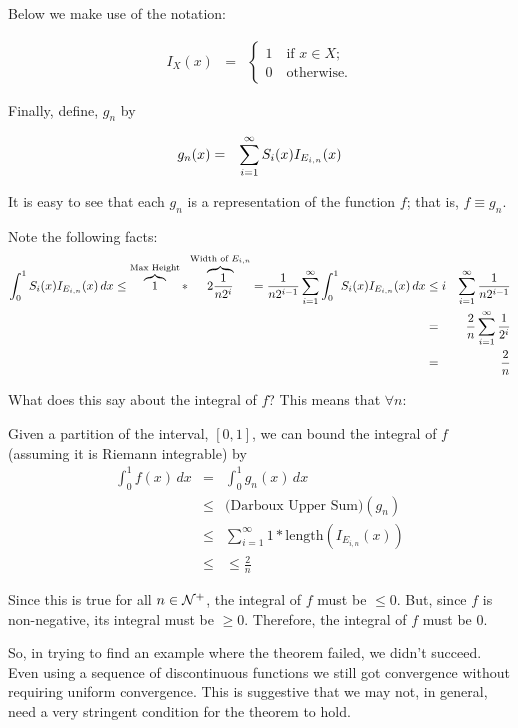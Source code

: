 \documentclass{article}
\begin{document}
Below we make use of the notation: 

\begin{eqnarray}
I_X(x) & = & \begin{cases} 1 \quad \text{if $x \in X$}; \\ 0 \quad \text{otherwise.} \end{cases}
\end{eqnarray}

Finally, define, $g_n$ by

\begin{eqnarray}
	g_{n}(x) & = & \sum_{i=1}^\infty\limits S_{i}(x) I_{E_{i,n}}(x)
\end{eqnarray}

It is easy to see that each $g_n$ is a representation of the function $f$; 
that is, $f \equiv g_n$.

Note the following facts:
\begin{eqnarray*}
  \int_0^1 S_{i}(x) I_{E_{i,n}}(x)\, dx \le \overbrace{1}^{\text{Max Height}} * \overbrace{2\frac{1}{n2^{i}}}^{\text{Width of $E_{i,n}$}} = \frac{1}{n2^{i-1}}
  \sum_{i=1}^\infty \int_0^1 S_{i}(x) I_{E_{i,n}}(x)\, dx & \le i & \sum_{i=1}^\infty\limits \frac{1}{n2^{i-1}}  \\ 
															 & =  & \frac{2}{n} \sum_{i=1}^\infty\limits \frac{1}{2^{i}} \\
															 & =  & \frac{2}{n}
 \end{eqnarray*}

What does this say about the integral of $f$? 
This means that $\forall n$: 

Given a partition of the interval, $[0,1]$, we can bound the integral of $f$ 
(assuming it is Riemann integrable) by
\begin{eqnarray*}
	\int_0^1 f(x) \, dx & =   & \int_0^1 g_{n}(x) \, dx \\
						& \le & \text{(Darboux Upper Sum)}(g_n)  \\
						& \le & \sum_{i=1}^\infty 1 * \text{length}(I_{E_{i,n}}(x)) \\
						& \le & \le  \frac{2}{n}
\end{eqnarray*}

Since this is true for all $n \in {\cal N}^+$, the integral of $f$ must be $\le 0$. 
But, since $f$ is non-negative, its integral must be $\ge 0$. Therefore, the 
integral of $f$ must be $0$.

So, in trying to find an example where the theorem failed, we didn't succeed. 
Even using a sequence of discontinuous functions we still got convergence without 
requiring uniform convergence. This is suggestive that we may not, in general, 
need a very stringent condition for the theorem to hold.
\end{document}
